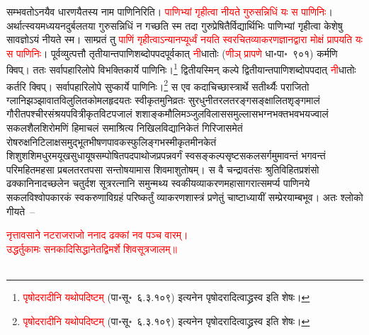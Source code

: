 \begin{sloppypar}\justifying\noindent सम्भवतोऽनयैव धारणयैतस्य नाम पाणिनिरिति। \textcolor{red}{पाणिभ्यां गृहीत्वा नीयते गुरु\-सन्निधिं यः स पाणिनिः}। अर्थात्स्वयमध्ययन\-दुर्बलतया गुरु\-सन्निधिं न गच्छति स्म तदा गुरु\-प्रेषितैर्विद्यार्थिभिः पाणिभ्यां गृहीत्वा केशेषु सावज्ञोऽयं नीयते स्म। साम्प्रतं तु \textcolor{red}{पाणिं गृहीत्वाऽन्यानप्यूर्ध्वं नयति स्व\-रचित\-व्याकरण\-ज्ञान\-द्वारा मोक्षं प्रापयति यः स पाणिनिः}। पूर्व\-व्युत्पत्तौ तृतीयान्त\-पाणि\-शब्दोपपद\-पूर्वकात् \textcolor{red}{नी}\-धातोः (\textcolor{red}{णीञ् प्रापणे} धा॰पा॰~९०१) कर्मणि क्विप्।
ततः सर्वापहारि\-लोपे विभक्ति\-कार्ये पाणिनिः।\footnote{\textcolor{red}{पृषोदरादीनि यथोपदिष्टम्} (पा॰सू॰~६.३.१०९) इत्यनेन पृषोदरादित्वाद्ध्रस्व इति शेषः।} द्वितीयस्मिन् कल्पे द्वितीयान्त\-पाणि\-शब्दोपपदात् \textcolor{red}{नी}\-धातोः कर्तरि क्विप्।
सर्वापहारि\-लोपे सुप्कार्ये पाणिनिः।\footnote{\textcolor{red}{पृषोदरादीनि यथोपदिष्टम्} (पा॰सू॰~६.३.१०९) इत्यनेन पृषोदरादित्वाद्ध्रस्व इति शेषः।} स एव कदाचिच्छास्त्रार्थे सतीर्थ्यैः पराजितो ग्लानि\-झञ्झावात\-विलुलित\-कोमल\-हृदयतः स्वीकृत\-मुनि\-व्रतः सुर\-धुनी\-तरल\-तरङ्ग\-सङ्क्षालित\-शृङ्गमालं गौरी\-तपश्चीर\-संश्रय\-पवित्रीकृत\-विटप\-जालं शशाङ्क\-मौलि\-मञ्जुल\-विलास\-समुल्लास\-भग्न\-भक्त\-भव\-भय\-ज्वालं सकल\-शैल\-शिरोमणिं हिमाचलं समाश्रित्य निखिल\-विद्या\-निकेतं गिरिजा\-समेतं रोष\-रुक्ष\-निटिलाक्ष\-समुद्भूत\-भीषण\-पावक\-स्फुलिङ्ग\-भस्मीकृत\-मीन\-केतं शिशु\-शशि\-मधुर\-मयूख\-सुधा\-यूष\-सम्पोषित\-पद\-पाथोज\-प्रपन्न\-वर्गं स्व\-सङ्कल्प\-सृष्ट\-सकल\-सर्गमुमावन्तं भगवन्तं परिमहित\-महसा प्रबलतर\-तपसा सन्तोषयामास शिवमाशु\-तोषम्। स वै चन्द्रावतंसः श्रुति\-विहित\-प्रशंसो ढक्का\-निनाद\-च्छलेन चतुर्दश सूत्र\-रत्नानि समुन्मथ्य स्वकीय\-व्याकरण\-महा\-सागरात्समर्प्य पाणिनये सकल\-विश्वोपकारकं स्वकरुणा\-विग्रहं परिष्कर्तुं व्याकरण\-शास्त्रं प्रणेतुं चाष्टाध्यायीं सम्प्रेरयाम्बभूव। अतः श्लोको गीयते~–\end{sloppypar}
\centering\textcolor{red}{नृत्तावसाने नटराजराजो ननाद ढक्कां नव पञ्च वारम्।\nopagebreak\\
उद्धर्तुकामः सनकादिसिद्धानेतद्विमर्शे शिवसूत्रजालम्॥}\nopagebreak\\
\\
